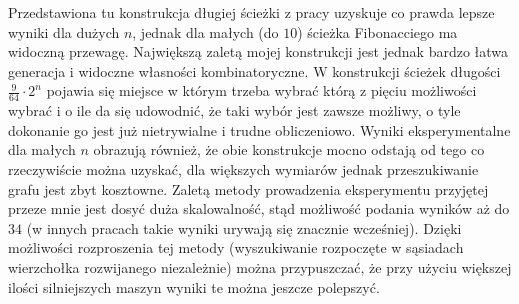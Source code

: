 \documentclass{pracamgr}
\begin{document}
    Przedstawiona tu konstrukcja długiej ścieżki z pracy \cite{Snake2} uzyskuje co prawda lepsze wyniki dla dużych $n$, jednak dla małych (do $10$)
    ścieżka Fibonacciego ma widoczną przewagę. Największą zaletą mojej konstrukcji jest jednak bardzo łatwa generacja i widoczne własności kombinatoryczne. 
    W konstrukcji ścieżek długości $\frac{9}{64}\cdot2^n$ pojawia się miejsce w którym trzeba wybrać którą z pięciu możliwości wybrać i o ile da się udowodnić,
    że taki wybór jest zawsze możliwy, o tyle dokonanie go jest już nietrywialne i trudne obliczeniowo. Wyniki eksperymentalne dla małych $n$ obrazują również,
    że obie konstrukcje mocno odstają od tego co rzeczywiście można uzyskać, dla większych wymiarów jednak przeszukiwanie grafu jest zbyt kosztowne.
    Zaletą metody prowadzenia eksperymentu przyjętej przeze mnie jest dosyć duża skalowalność, stąd możliwość podania wyników aż do $34$
    (w innych pracach takie wyniki urywają się znacznie wcześniej).
    Dzięki możliwości rozproszenia tej metody (wyszukiwanie rozpoczęte w sąsiadach wierzchołka rozwijanego niezależnie) można przypuszczać,
    że przy użyciu większej ilości silniejszych maszyn wyniki te można jeszcze polepszyć.
    
    
\end{document}
